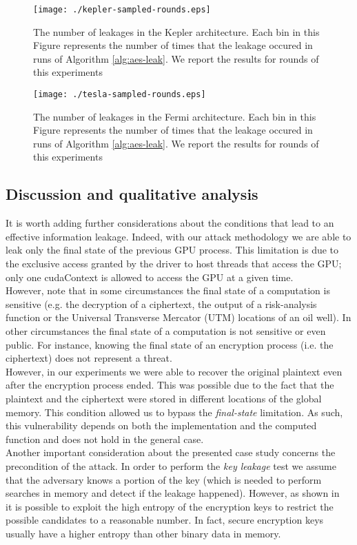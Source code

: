 \documentclass[11pt,onecolumn,letterpaper]{IEEEtran}
\begin{document}
\begin{figure}[t]
  \centering
  \texttt{[image: ./kepler-sampled-rounds.eps]}
  
  \caption{The number of leakages in the Kepler architecture. Each bin in this Figure represents the number of times that the leakage occured in  runs of Algorithm \ref{alg:aes-leak}.
  We report the results for  rounds of this experiments} 
  \label{fig:kepler-rounds}
\end{figure}

\begin{figure}[t]
  \centering
  \texttt{[image: ./tesla-sampled-rounds.eps]}
    \caption{The number of leakages in the Fermi architecture. Each bin in this Figure represents the number of times that the leakage occured in  runs of Algorithm \ref{alg:aes-leak}.
  We report the results for  rounds of this experiments}
  \label{fig:tesla-rounds}
\end{figure}


\subsection{Discussion and qualitative analysis}
\label{leakagequality2} 
It is worth adding further considerations about the conditions 
that lead to an effective information leakage. 
Indeed, with our attack methodology we are able to leak only the final state of the previous GPU process.  
This limitation is due to the exclusive access granted by the driver to host threads that access the GPU; only one 
cudaContext is allowed to access the GPU at a given time. \\
However, note that in some circumstances the final state of a computation is sensitive 
(e.g. the decryption of a ciphertext, the output of a risk-analysis function or the Universal Transverse Mercator (UTM) locations of an oil well). 
In other circumstances the final state of a computation is not sensitive or even public. 
For instance, knowing the final state of an encryption process (i.e. the ciphertext) does not represent a threat.\\ 
However, in our experiments we were able to recover the original plaintext even after the encryption process ended. 
This was possible due to the fact that the plaintext and the ciphertext were stored in different locations of the global memory. 
This condition allowed us to bypass the \emph{final-state} limitation.
As such, this vulnerability depends on both the implementation and the computed function and does not hold in the general case.\\
Another important consideration about the presented case study concerns the precondition of the attack. 
In order to perform the \emph{key leakage} test we assume that the adversary knows a portion of the key 
(which is needed to perform searches in memory and detect if the leakage happened). 
However, as shown in~\cite{coldboot,zeus} it is possible to exploit the high entropy of the encryption keys to restrict the possible candidates to a reasonable number.
In fact, secure encryption keys usually have a higher entropy than other binary data in memory.
\end{document}
